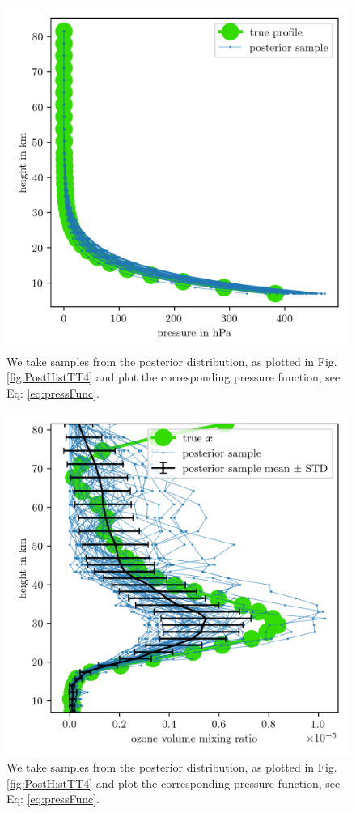 \begin{figure}[ht!]
	\centering
	\includegraphics{PressPostMeanSigm.png}
	\caption[Pressure posterior samples.]{We take samples from the posterior distribution, as plotted in Fig. \ref{fig:PostHistTT4} and plot the corresponding pressure function, see Eq: \ref{eq:pressFunc}.}
	\label{fig:PressPost}
\end{figure}

\begin{figure}[ht!]
	\centering
	\includegraphics{FullO3Res.png}
	\caption[Pressure posterior samples.]{We take samples from the posterior distribution, as plotted in Fig. \ref{fig:PostHistTT4} and plot the corresponding pressure function, see Eq: \ref{eq:pressFunc}.}
	\label{fig:O3Post}
\end{figure}


